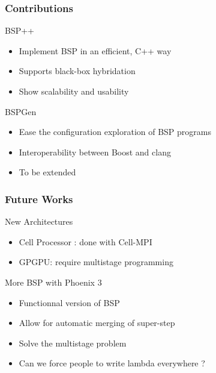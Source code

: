 \frame
{
  \frametitle{Contributions}
  \begin{block}{BSP++}
  \begin{itemize}
  \footnotesize
  \item Implement BSP in an efficient, C++ way
  \item Supports black-box hybridation
  \item Show scalability and usability
 \end{itemize}
  \end{block}{}

  \begin{block}{BSPGen}
  \begin{itemize}
  \footnotesize
  \item Ease the configuration exploration of BSP programs
  \item Interoperability between Boost and clang
  \item To be extended
 \end{itemize}
  \end{block}{}
}

\frame
{
  \frametitle{Future Works}
  \begin{block}{New Architectures}
  \begin{itemize}
  \footnotesize
  \item Cell Processor : done with Cell-MPI
  \item GPGPU: require multistage programming
 \end{itemize}
  \end{block}{}

  \begin{block}{More BSP with Phoenix 3}
  \begin{itemize}
  \footnotesize
   \item Functionnal version of BSP
   \item Allow for automatic merging of super-step
   \item Solve the multistage problem
   \item Can we force people to write lambda everywhere ? 
 \end{itemize}
  \end{block}{}
}
